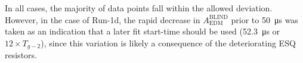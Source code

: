 In all cases, the majority of data points fall within the allowed deviation. However, in the case of Run-1d, the rapid decrease in $A_{\text{EDM}}^{\text{BLIND}}$ prior to \SI{50}{\micro\second} was taken as an indication that a later fit start-time should be used (\SI{52.3}{\micro\second} or $12\times T_{g-2}$), since this variation is likely a consequence of the deteriorating ESQ resistors. 

\begin{figure}[t!]
\centering{}
\hfill


\end{figure}
